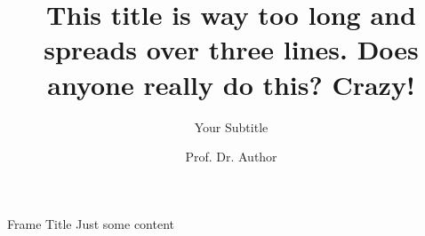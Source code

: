 \documentclass[aspectratio=169]{beamer}
\author{Prof. Dr. Author}
\title{This title is way too long and spreads over three lines. Does anyone really do this? Crazy!}
\subtitle{Your Subtitle}
\begin{document}
\maketitle

\begin{frame}{Frame Title}
Just some content
\end{frame}
\end{document}
